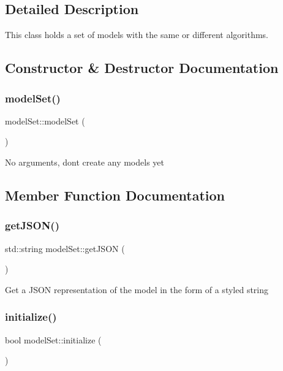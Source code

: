 \subsection{Detailed Description}
This class holds a set of models with the same or different algorithms. 

\subsection{Constructor \& Destructor Documentation}
\mbox{\label{classmodel_set_ae44cba85f4c52e7d05e0f622b3ea9030}} 
\subsubsection{\texorpdfstring{model\+Set()}{modelSet()}}
{\footnotesize\ttfamily model\+Set\+::model\+Set (\begin{DoxyParamCaption}{ }\end{DoxyParamCaption})}

No arguments, don\textquotesingle{}t create any models yet 

\subsection{Member Function Documentation}
\mbox{\label{classmodel_set_a031987885b1462ec7d7dbeef0c803d97}} 
\subsubsection{\texorpdfstring{get\+J\+S\+O\+N()}{getJSON()}}
{\footnotesize\ttfamily std\+::string model\+Set\+::get\+J\+S\+ON (\begin{DoxyParamCaption}{ }\end{DoxyParamCaption})}

Get a J\+S\+ON representation of the model in the form of a styled string \mbox{\label{classmodel_set_afefb50a0fe8f45821c6a7599784d7eb4}} 
\subsubsection{\texorpdfstring{initialize()}{initialize()}}
{\footnotesize\ttfamily bool model\+Set\+::initialize (\begin{DoxyParamCaption}{ }\end{DoxyParamCaption})}

